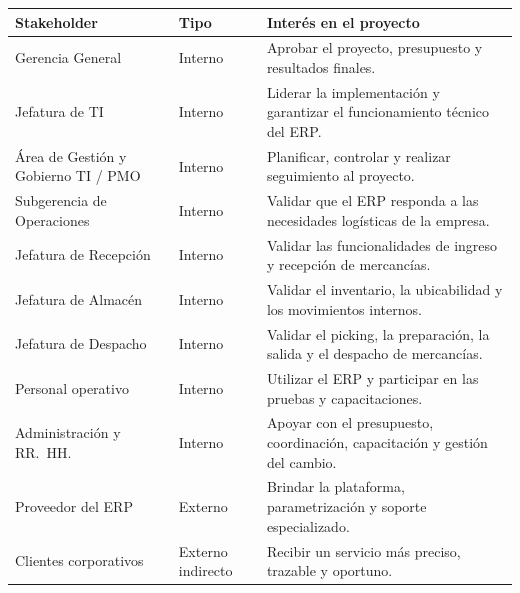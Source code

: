 \documentclass[11pt, a4paper, oneside]{report}
\begin{document}
\begin{table}[H]
\centering
\small
\renewcommand{\arraystretch}{1.35}
\setlength{\tabcolsep}{6pt}

\begin{tabularx}{\textwidth}{
    |>{\raggedright\arraybackslash}p{}
    |>{\centering\arraybackslash}p{}
    |>{\raggedright\arraybackslash}X|
}
\hline

\rowcolor{upeu_dark}
\centering\color{white}\bfseries Stakeholder
&
\color{white}\bfseries Tipo
&
\centering\arraybackslash\color{white}\bfseries Interés en el proyecto
\\
\hline

\rowcolor{gray!10}
Gerencia General
&
Interno
&
Aprobar el proyecto, presupuesto y resultados finales.
\\
\hline

Jefatura de TI
&
Interno
&
Liderar la implementación y garantizar el funcionamiento técnico del ERP.
\\
\hline

\rowcolor{gray!10}
Área de Gestión y Gobierno TI / PMO
&
Interno
&
Planificar, controlar y realizar seguimiento al proyecto.
\\
\hline

Subgerencia de Operaciones
&
Interno
&
Validar que el ERP responda a las necesidades logísticas de la empresa.
\\
\hline

\rowcolor{gray!10}
Jefatura de Recepción
&
Interno
&
Validar las funcionalidades de ingreso y recepción de mercancías.
\\
\hline

Jefatura de Almacén
&
Interno
&
Validar el inventario, la ubicabilidad y los movimientos internos.
\\
\hline

\rowcolor{gray!10}
Jefatura de Despacho
&
Interno
&
Validar el picking, la preparación, la salida y el despacho de mercancías.
\\
\hline

Personal operativo
&
Interno
&
Utilizar el ERP y participar en las pruebas y capacitaciones.
\\
\hline

\rowcolor{gray!10}
Administración y RR.\ HH.
&
Interno
&
Apoyar con el presupuesto, coordinación, capacitación y gestión del cambio.
\\
\hline

Proveedor del ERP
&
Externo
&
Brindar la plataforma, parametrización y soporte especializado.
\\
\hline

\rowcolor{gray!10}
Clientes corporativos
&
Externo indirecto
&
Recibir un servicio más preciso, trazable y oportuno.
\\
\hline

\end{tabularx}
\end{table}
\end{document}
